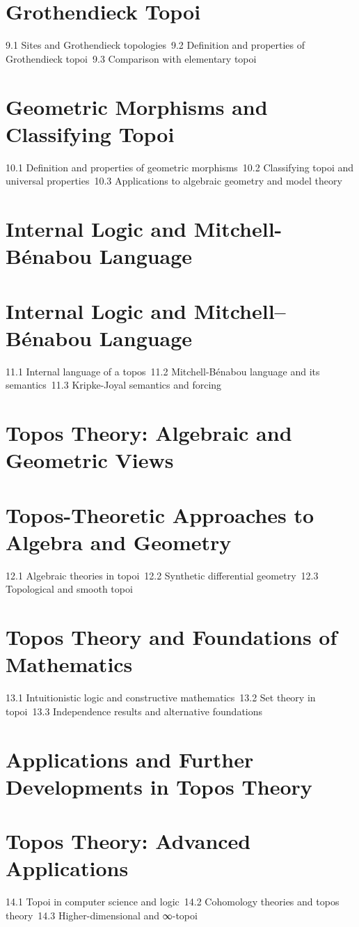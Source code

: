 \section{Grothendieck Topoi}
9.1 Sites and Grothendieck topologies\
9.2 Definition and properties of Grothendieck topoi\
9.3 Comparison with elementary topoi\
\section{Geometric Morphisms and Classifying Topoi}
10.1 Definition and properties of geometric morphisms\
10.2 Classifying topoi and universal properties\
10.3 Applications to algebraic geometry and model theory\
\section{Internal Logic and Mitchell-Bénabou Language}
\section{Internal Logic and Mitchell–Bénabou Language}
11.1 Internal language of a topos\
11.2 Mitchell-Bénabou language and its semantics\
11.3 Kripke-Joyal semantics and forcing\
\section{Topos Theory: Algebraic and Geometric Views}
\section{Topos-Theoretic Approaches to Algebra and Geometry}
12.1 Algebraic theories in topoi\
12.2 Synthetic differential geometry\
12.3 Topological and smooth topoi\
\section{Topos Theory and Foundations of Mathematics}
13.1 Intuitionistic logic and constructive mathematics\
13.2 Set theory in topoi\
13.3 Independence results and alternative foundations\
\section{Applications and Further Developments in Topos Theory}
\section{Topos Theory: Advanced Applications}
14.1 Topoi in computer science and logic\
14.2 Cohomology theories and topos theory\
14.3 Higher-dimensional and ∞-topoi\
